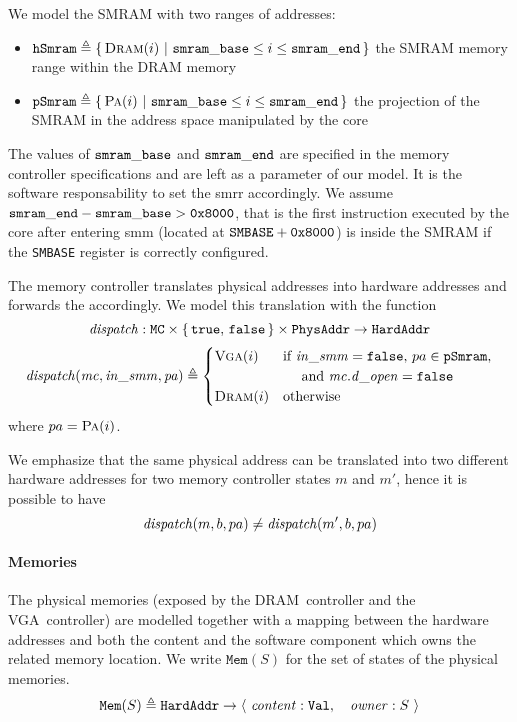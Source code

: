 We model the SMRAM with two ranges of addresses:
%
\begin{itemize}
\item
  $\texttt{hSmram} \triangleq \{\,\textsc{Dram}(i)\ |\ \mathtt{smram\_base} \leq i
    \le \mathtt{smram\_end}\,\}$ the SMRAM memory range within the DRAM memory
%
\item
  $\texttt{pSmram} \triangleq \{\,\textsc{Pa}(i)\ |\ \mathtt{smram\_base} \leq i
    \le \mathtt{smram\_end}\,\}$ the projection of the SMRAM in the address space
  manipulated by the core
\end{itemize}
%
The values of $\mathtt{smram\_base}$ and $\mathtt{smram\_end}$ are specified in the
memory controller specifications and are left as a parameter of our model.
%
It is the software responsability to set the \ac{smrr} accordingly.
%
We assume $\mathtt{smram\_end} - \mathtt{smram\_base} > \mathtt{0x8000}$, that is the
first instruction executed by the core after entering \ac{smm} (located at
$\texttt{SMBASE} + \mathtt{0x8000}$) is inside the SMRAM if the \texttt{SMBASE}
register is correctly configured.

The memory controller translates physical addresses into hardware addresses and
forwards the \IO accordingly.
%
We model this translation with the function
%
\[
  \mathit{dispatch} : \texttt{MC} \times \{\,\mathtt{true},\,\mathtt{false}\,\}
  \times \texttt{PhysAddr} \rightarrow \texttt{HardAddr}
\]
%
\[
  \mathit{dispatch}(\mathit{mc}, \mathit{in\_smm}, \mathit{pa}) \triangleq
  \begin{cases}
    \textsc{Vga}(i) & \text{if }\mathit{in\_smm} = \mathtt{false}\text{, }pa \in
    \texttt{pSmram}\text{,} \\
    & \quad\text{ and } \mathit{mc}.\mathit{d\_open} = \mathtt{false}  \\
    \textsc{Dram}(i) & \text{otherwise}
  \end{cases}
\]
%
\qquad\qquad\qquad\qquad\qquad\qquad where $pa = \textsc{Pa}(i)$.

We emphasize that the same physical address can be translated into two different
hardware addresses for two memory controller states $m$ and $m'$, hence it is
possible to have
%
\[
  \mathit{dispatch}(m, b, pa) \neq \mathit{dispatch}(m', b, pa)
\]

\paragraph{Memories}
%
The physical memories (exposed by the DRAM controller and the VGA controller)
are modelled together with a mapping between the hardware addresses and both the
content and the software component which owns the related memory location.
%
We write $\texttt{Mem}(S)$ for the set of states of the physical memories.
\[
  \texttt{Mem}(S) \triangleq \texttt{HardAddr} \rightarrow
  \langle~\mathit{content}: \texttt{Val},\quad\mathit{owner}: S~\rangle
\]

